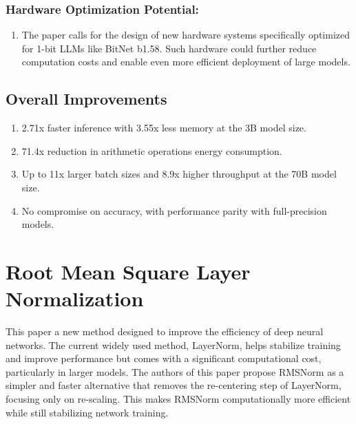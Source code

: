 \documentclass{report}
\begin{document}
	
	\subsection{Hardware Optimization Potential:}
	\begin{enumerate}
		\item 
		The paper calls for the design of new hardware systems specifically optimized for 1-bit LLMs like BitNet b1.58. Such hardware could further reduce computation costs and enable even more efficient deployment of large models.
	\end{enumerate}
	
	
	\section{Overall Improvements}
	\begin{enumerate}
		\item 
		2.71x faster inference with 3.55x less memory at the 3B model size.
		
		\item
		71.4x reduction in arithmetic operations energy consumption.
		
		\item
		Up to 11x larger batch sizes and 8.9x higher throughput at the 70B model size.
		
		\item
		No compromise on accuracy, with performance parity with full-precision models.
	\end{enumerate}
	
	
	
	
	
	
	
	
	
	
	
	
	\chapter{Root Mean Square Layer Normalization \cite{zhang2019rootmeansquarelayer}}
	This paper a new method designed to improve the efficiency of deep neural networks. The current widely used method, LayerNorm, helps stabilize training and improve performance but comes with a significant computational cost, particularly in larger models. The authors of this paper propose RMSNorm as a simpler and faster alternative that removes the re-centering step of LayerNorm, focusing only on re-scaling. This makes RMSNorm computationally more efficient while still stabilizing network training.
	
\end{document}
